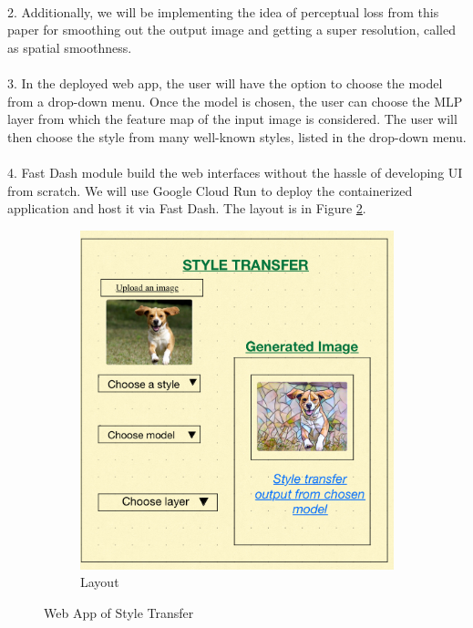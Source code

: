 \paragraph{}
2. Additionally, we will be implementing the idea of perceptual loss from this paper \cite{perceptual_loss} for smoothing out the output image and getting a super resolution, called as spatial smoothness.

\paragraph{}
3. In the deployed web app, the user will have the option to choose the model from a drop-down menu. Once the model is chosen, the user can choose the MLP layer from which the feature map of the input image is considered. The user will then choose the style from many well-known styles, listed in the drop-down menu. 

\paragraph{}
4. Fast Dash module build the web interfaces without the hassle of developing UI from scratch. We will use Google Cloud Run to deploy the containerized application and host it via Fast Dash. The layout is in Figure \ref{fig:layout}.


\begin{figure}[H]
\centering
\centering
        \begin{subfigure}[b]{0.49\textwidth}
            \centering
            \includegraphics[width=\textwidth]{./images/demo-app.png}
            \caption{Layout}\label{fig:1a}
        \end{subfigure}
        
\caption{Web App of Style Transfer}
\label{fig:layout} 
\end{figure}

